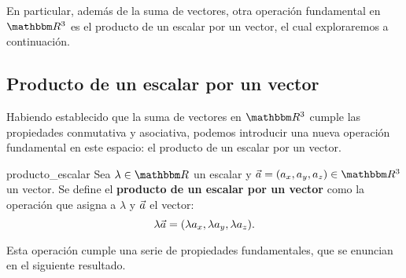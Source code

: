 En particular, además de la suma de vectores, otra operación fundamental en $\RR[3]$ es el producto de un escalar por un vector, el cual exploraremos a continuación.

\subsection{Producto de un escalar por un vector}

Habiendo establecido que la suma de vectores en $\RR[3]$ cumple las propiedades conmutativa y asociativa, podemos introducir una nueva operación fundamental en este espacio: el producto de un escalar por un vector.

\begin{definition}{}{producto_escalar}
    Sea $\lambda \in \RR$ un escalar y $\veca = (a_x, a_y, a_z) \in \RR[3]$ un vector. Se define el \textbf{producto de un escalar por un vector} como la operación que asigna a $\lambda$ y $\vec{a}$ el vector:
    $$\lambda \vec{a} = (\lambda a_x, \lambda a_y, \lambda a_z).$$
\end{definition}

Esta operación cumple una serie de propiedades fundamentales, que se enuncian en el siguiente resultado.

